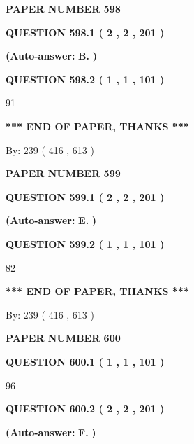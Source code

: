 \documentclass{ctexart}
\begin{document}
   
 {\textbf{ \Large{ PAPER NUMBER  598  }}}
   
   
   
   
  
  
{\textbf{\large{QUESTION
598.1 
 ( 2 , 2 , 201 )
}}}
 
 
{\textbf{(Auto-answer:}}
{\textbf{\large{
B.}}}
{\textbf{)}}
 
 
  
  
{\textbf{\large{QUESTION
598.2 
 ( 1 , 1 , 101 )
}}}

91
   
   
   
   
\vspace{1.0in} 
{\textbf{\large{ *** END OF PAPER, THANKS *** }}} 
   
   
\hspace{1.0in} By: 
 239 ( 416 ,  613 )
   
   
   
   
\newpage 
\setcounter{page}{ 
   599001 } 
   
   
 {\textbf{ \Large{ PAPER NUMBER  599  }}}
   
   
   
   
  
  
{\textbf{\large{QUESTION
599.1 
 ( 2 , 2 , 201 )
}}}
 
 
{\textbf{(Auto-answer:}}
{\textbf{\large{
E.}}}
{\textbf{)}}
 
 
  
  
{\textbf{\large{QUESTION
599.2 
 ( 1 , 1 , 101 )
}}}

82
   
   
   
   
\vspace{1.0in} 
{\textbf{\large{ *** END OF PAPER, THANKS *** }}} 
   
   
\hspace{1.0in} By: 
 239 ( 416 ,  613 )
   
   
   
   
\newpage 
\setcounter{page}{ 
   600001 } 
   
   
 {\textbf{ \Large{ PAPER NUMBER  600  }}}
   
   
   
   
  
  
{\textbf{\large{QUESTION
600.1 
 ( 1 , 1 , 101 )
}}}

96
  
  
{\textbf{\large{QUESTION
600.2 
 ( 2 , 2 , 201 )
}}}
 
 
{\textbf{(Auto-answer:}}
{\textbf{\large{
F.}}}
{\textbf{)}}
 
\end{document}

